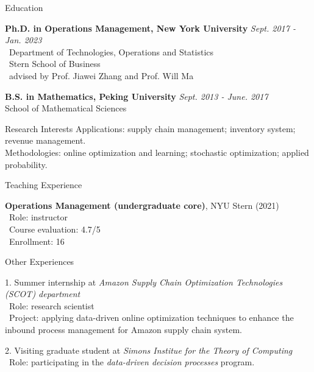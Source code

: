 \documentclass{resume} %
\begin{document}


\begin{rSection}{Education}

{\bf Ph.D. in Operations Management, New York University} \hfill {\em Sept. 2017 - Jan. 2023}
\\ \ Department of Technologies, Operations and Statistics
\\ \ Stern School of Business
\\ \ advised by Prof. Jiawei Zhang and Prof. Will Ma


{\bf B.S. in Mathematics, Peking University} \hfill {\em Sept. 2013 - June. 2017}
\\School of Mathematical Sciences


\end{rSection}
\vspace{0.2cm}


\begin{rSection}{Research Interests}
Applications: supply chain management; inventory system; revenue management. \\
Methodologies: online optimization and learning; stochastic optimization; applied probability.
\end{rSection}

\vspace{0.2cm}

\begin{rSection}{Teaching Experience}
\vspace{-0.3cm}
\item[] \textbf{Operations Management (undergraduate core)}, NYU Stern (2021)\\
\small
  \ Role: instructor\\
  \ Course evaluation: 4.7/5\\
  \ Enrollment: 16

\end{rSection}
\smallskip

\begin{rSection}{Other Experiences}
\vspace{-0.3cm}
\item[1.] Summer internship at \textit{Amazon Supply Chain Optimization Technologies (SCOT) department}\\
\small
  \ Role: research scientist\\
  \ Project: applying data-driven online optimization techniques to enhance the inbound process management for Amazon supply chain system.

\item[2.] Visiting graduate student at \textit{Simons Institue for the Theory of Computing}\\
\small
  \ Role: participating in the \textit{data-driven decision processes} program.

\end{rSection}
\smallskip
\end{document}
